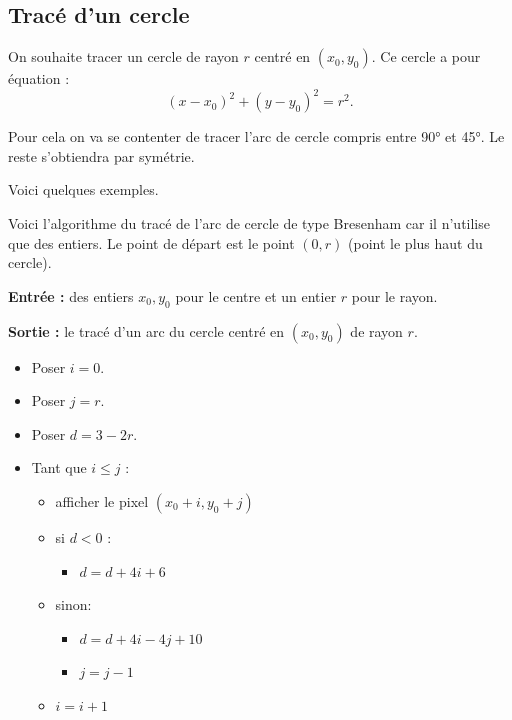 \documentclass[11pt,class=report,crop=false]{standalone}
\begin{document}
\subsection{Tracé d'un cercle}

On souhaite tracer un cercle de rayon $r$ centré en $(x_0,y_0)$.
Ce cercle a pour équation :
$$(x-x_0)^2 + (y-y_0)^2 = r^2.$$

Pour cela on va se contenter de tracer l'arc de cercle compris entre \ang{90} et \ang{45}. Le reste s'obtiendra par symétrie.



Voici quelques exemples.


\begin{center}
\begin{minipage}{0.45\textwidth}	
\end{minipage}
\begin{minipage}{0.45\textwidth}
\end{minipage}
\end{center}
Voici l'algorithme du tracé de l'arc de cercle de type Bresenham car il n'utilise que des entiers. Le point de départ est le point $(0,r)$ (point le plus haut du cercle).

\begin{algorithme}

\textbf{Entrée :} des entiers $x_0, y_0$ pour le centre et un entier $r$ pour le rayon.

\textbf{Sortie :} le tracé d'un arc du cercle centré en $(x_0,y_0)$ de rayon $r$.

\begin{itemize}
	\item Poser $i = 0$.
    \item Poser $j = r$.	
	\item Poser $d = 3 - 2r$.
		
	\item Tant que $i \le j$ :
	\begin{itemize}
		\item afficher le pixel $(x_0+i,y_0+j)$
		
		\item si $d < 0$ :
			\begin{itemize}
			\item $d = d+ 4i+6$
			\end{itemize}
		\item sinon:
			\begin{itemize}		
			\item $d=d+4i-4j+10$		
			\item $j=j-1$
			\end{itemize}			
		\item $i = i + 1$
	\end{itemize}
\end{itemize}
\end{algorithme}
	
\end{document}
